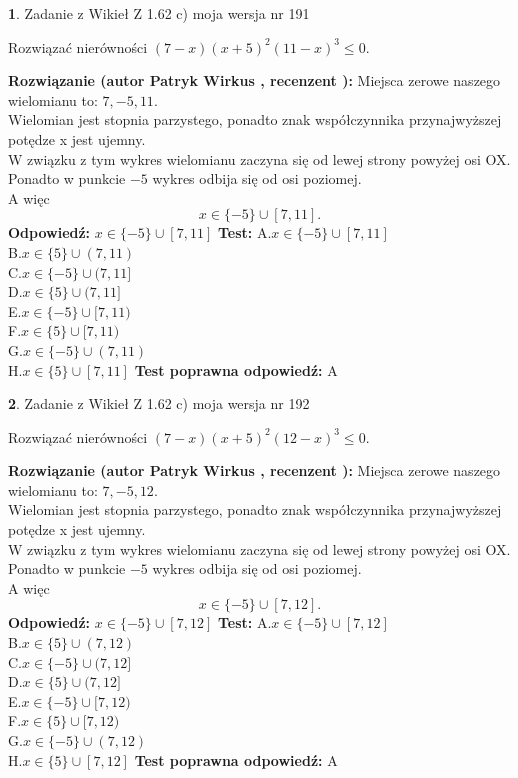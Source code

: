 \documentclass[12pt, a4paper]{article}
\theoremstyle{definition} %
\newtheorem{zad}{}
\newcommand{\zadStart}[1]{\begin{zad}#1\newline}
\newcommand{\zadStop}{\end{zad}}
\newcommand{\rozwStart}[2]{\noindent \textbf{Rozwiązanie (autor #1 , recenzent #2): }\newline}
\newcommand{\rozwStop}{\newline}
\newcommand{\odpStart}{\noindent \textbf{Odpowiedź:}\newline}
\newcommand{\odpStop}{\newline}
\newcommand{\testStart}{\noindent \textbf{Test:}\newline}
\newcommand{\testStop}{\newline}
\newcommand{\kluczStart}{\noindent \textbf{Test poprawna odpowiedź:}\newline}
\newcommand{\kluczStop}{\newline}
\begin{document}
\zadStart{Zadanie z Wikieł Z 1.62 c) moja wersja nr 191}

Rozwiązać nierówności $(7-x)(x+5)^{2}(11-x)^{3}\le0$.
\zadStop
\rozwStart{Patryk Wirkus}{}
Miejsca zerowe naszego wielomianu to: $7, -5, 11$.\\
Wielomian jest stopnia parzystego, ponadto znak współczynnika przy\linebreak najwyższej potędze x jest ujemny.\\ W związku z tym wykres wielomianu zaczyna się od lewej strony powyżej osi OX.\\
Ponadto w punkcie $-5$ wykres odbija się od osi poziomej.\\
A więc $$x \in \{-5\} \cup [7,11].$$
\rozwStop
\odpStart
$x \in \{-5\} \cup [7,11]$
\odpStop
\testStart
A.$x \in \{-5\} \cup [7,11]$\\
B.$x \in \{5\} \cup (7,11)$\\
C.$x \in \{-5\} \cup (7,11]$\\
D.$x \in \{5\} \cup (7,11]$\\
E.$x \in \{-5\} \cup [7,11)$\\
F.$x \in \{5\} \cup [7,11)$\\
G.$x \in \{-5\} \cup (7,11)$\\
H.$x \in \{5\} \cup [7,11]$
\testStop
\kluczStart
A
\kluczStop



\zadStart{Zadanie z Wikieł Z 1.62 c) moja wersja nr 192}

Rozwiązać nierówności $(7-x)(x+5)^{2}(12-x)^{3}\le0$.
\zadStop
\rozwStart{Patryk Wirkus}{}
Miejsca zerowe naszego wielomianu to: $7, -5, 12$.\\
Wielomian jest stopnia parzystego, ponadto znak współczynnika przy\linebreak najwyższej potędze x jest ujemny.\\ W związku z tym wykres wielomianu zaczyna się od lewej strony powyżej osi OX.\\
Ponadto w punkcie $-5$ wykres odbija się od osi poziomej.\\
A więc $$x \in \{-5\} \cup [7,12].$$
\rozwStop
\odpStart
$x \in \{-5\} \cup [7,12]$
\odpStop
\testStart
A.$x \in \{-5\} \cup [7,12]$\\
B.$x \in \{5\} \cup (7,12)$\\
C.$x \in \{-5\} \cup (7,12]$\\
D.$x \in \{5\} \cup (7,12]$\\
E.$x \in \{-5\} \cup [7,12)$\\
F.$x \in \{5\} \cup [7,12)$\\
G.$x \in \{-5\} \cup (7,12)$\\
H.$x \in \{5\} \cup [7,12]$
\testStop
\kluczStart
A
\kluczStop
\end{document}
